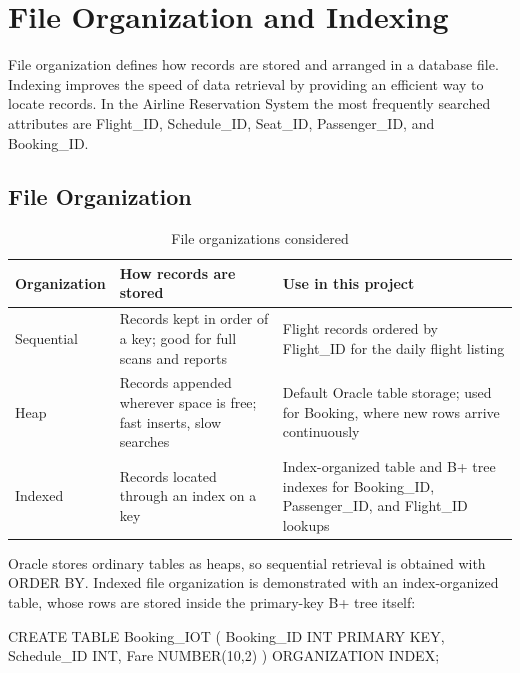 \documentclass[12pt,a4paper]{article}
\begin{document}
\section{File Organization and Indexing}
File organization defines how records are stored and arranged in a database file. Indexing improves the
speed of data retrieval by providing an efficient way to locate records. In the Airline Reservation System
the most frequently searched attributes are Flight_ID, Schedule_ID, Seat_ID, Passenger_ID, and Booking_ID.

\subsection{File Organization}
\begin{table}[H]
\centering\small
\begin{tabularx}{\textwidth}{l X X}
\toprule
\textbf{Organization} & \textbf{How records are stored} & \textbf{Use in this project}\\
\midrule
Sequential & Records kept in order of a key; good for full scans and reports & Flight records ordered by Flight_ID for the daily flight listing\\
Heap       & Records appended wherever space is free; fast inserts, slow searches & Default Oracle table storage; used for Booking, where new rows arrive continuously\\
Indexed    & Records located through an index on a key & Index-organized table and B+ tree indexes for Booking_ID, Passenger_ID, and Flight_ID lookups\\
\bottomrule
\end{tabularx}
\caption{File organizations considered}
\end{table}
Oracle stores ordinary tables as heaps, so sequential retrieval is obtained with ORDER BY. Indexed file
organization is demonstrated with an index-organized table, whose rows are stored inside the primary-key
B+ tree itself:
\begin{code}
CREATE TABLE Booking_IOT (
    Booking_ID  INT PRIMARY KEY,
    Schedule_ID INT,
    Fare        NUMBER(10,2)
) ORGANIZATION INDEX;
\end{code}
\end{document}
